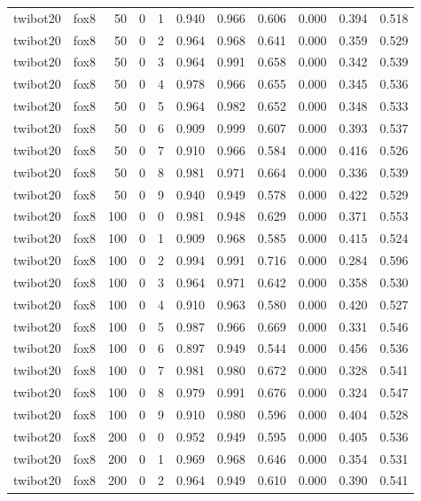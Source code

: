 \begin{tabular}{llrrrrrrrrr}
twibot20 & fox8 & 50 & 0 & 1 & 0.940 & 0.966 & 0.606 & 0.000 & 0.394 & 0.518 \\
twibot20 & fox8 & 50 & 0 & 2 & 0.964 & 0.968 & 0.641 & 0.000 & 0.359 & 0.529 \\
twibot20 & fox8 & 50 & 0 & 3 & 0.964 & 0.991 & 0.658 & 0.000 & 0.342 & 0.539 \\
twibot20 & fox8 & 50 & 0 & 4 & 0.978 & 0.966 & 0.655 & 0.000 & 0.345 & 0.536 \\
twibot20 & fox8 & 50 & 0 & 5 & 0.964 & 0.982 & 0.652 & 0.000 & 0.348 & 0.533 \\
twibot20 & fox8 & 50 & 0 & 6 & 0.909 & 0.999 & 0.607 & 0.000 & 0.393 & 0.537 \\
twibot20 & fox8 & 50 & 0 & 7 & 0.910 & 0.966 & 0.584 & 0.000 & 0.416 & 0.526 \\
twibot20 & fox8 & 50 & 0 & 8 & 0.981 & 0.971 & 0.664 & 0.000 & 0.336 & 0.539 \\
twibot20 & fox8 & 50 & 0 & 9 & 0.940 & 0.949 & 0.578 & 0.000 & 0.422 & 0.529 \\
twibot20 & fox8 & 100 & 0 & 0 & 0.981 & 0.948 & 0.629 & 0.000 & 0.371 & 0.553 \\
twibot20 & fox8 & 100 & 0 & 1 & 0.909 & 0.968 & 0.585 & 0.000 & 0.415 & 0.524 \\
twibot20 & fox8 & 100 & 0 & 2 & 0.994 & 0.991 & 0.716 & 0.000 & 0.284 & 0.596 \\
twibot20 & fox8 & 100 & 0 & 3 & 0.964 & 0.971 & 0.642 & 0.000 & 0.358 & 0.530 \\
twibot20 & fox8 & 100 & 0 & 4 & 0.910 & 0.963 & 0.580 & 0.000 & 0.420 & 0.527 \\
twibot20 & fox8 & 100 & 0 & 5 & 0.987 & 0.966 & 0.669 & 0.000 & 0.331 & 0.546 \\
twibot20 & fox8 & 100 & 0 & 6 & 0.897 & 0.949 & 0.544 & 0.000 & 0.456 & 0.536 \\
twibot20 & fox8 & 100 & 0 & 7 & 0.981 & 0.980 & 0.672 & 0.000 & 0.328 & 0.541 \\
twibot20 & fox8 & 100 & 0 & 8 & 0.979 & 0.991 & 0.676 & 0.000 & 0.324 & 0.547 \\
twibot20 & fox8 & 100 & 0 & 9 & 0.910 & 0.980 & 0.596 & 0.000 & 0.404 & 0.528 \\
twibot20 & fox8 & 200 & 0 & 0 & 0.952 & 0.949 & 0.595 & 0.000 & 0.405 & 0.536 \\
twibot20 & fox8 & 200 & 0 & 1 & 0.969 & 0.968 & 0.646 & 0.000 & 0.354 & 0.531 \\
twibot20 & fox8 & 200 & 0 & 2 & 0.964 & 0.949 & 0.610 & 0.000 & 0.390 & 0.541 \\

\end{tabular}
